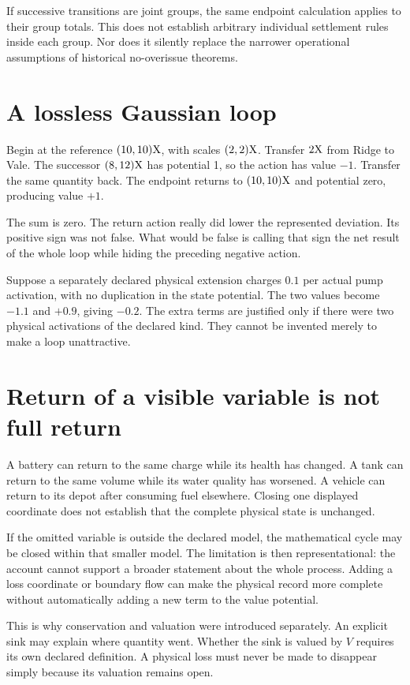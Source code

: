 If successive transitions are joint groups, the same endpoint calculation applies to their group totals. This does not establish arbitrary individual settlement rules inside each group. Nor does it silently replace the narrower operational assumptions of historical no-overissue theorems.

\section{A lossless Gaussian loop}
Begin at the reference $(10,10)\mathrm{X}$, with scales $(2,2)\mathrm{X}$. Transfer $2\mathrm{X}$ from Ridge to Vale. The successor $(8,12)\mathrm{X}$ has potential 1, so the action has value $-1$. Transfer the same quantity back. The endpoint returns to $(10,10)\mathrm{X}$ and potential zero, producing value $+1$.

The sum is zero. The return action really did lower the represented deviation. Its positive sign was not false. What would be false is calling that sign the net result of the whole loop while hiding the preceding negative action.

Suppose a separately declared physical extension charges $0.1$ per actual pump activation, with no duplication in the state potential. The two values become $-1.1$ and $+0.9$, giving $-0.2$. The extra terms are justified only if there were two physical activations of the declared kind. They cannot be invented merely to make a loop unattractive.

\section{Return of a visible variable is not full return}
A battery can return to the same charge while its health has changed. A tank can return to the same volume while its water quality has worsened. A vehicle can return to its depot after consuming fuel elsewhere. Closing one displayed coordinate does not establish that the complete physical state is unchanged.

If the omitted variable is outside the declared model, the mathematical cycle may be closed within that smaller model. The limitation is then representational: the account cannot support a broader statement about the whole process. Adding a loss coordinate or boundary flow can make the physical record more complete without automatically adding a new term to the value potential.

This is why conservation and valuation were introduced separately. An explicit sink may explain where quantity went. Whether the sink is valued by $V$ requires its own declared definition. A physical loss must never be made to disappear simply because its valuation remains open.

